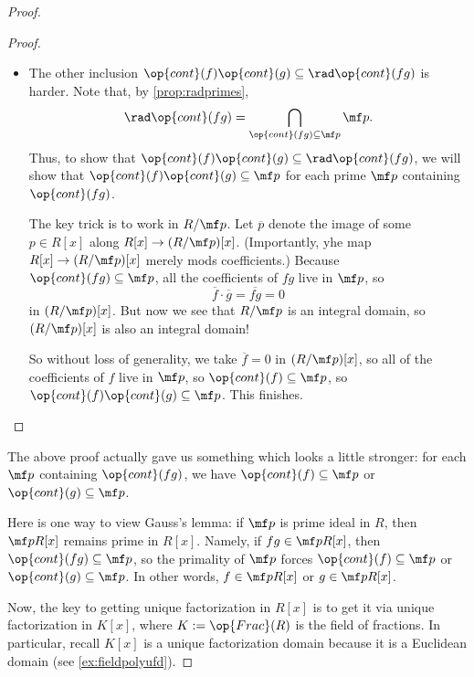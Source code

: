 \begin{proof}
\begin{proof}
\begin{itemize}
			\item The other inclusion $\op{cont}(f)\op{cont}(g)\subseteq\rad\op{cont}(fg)$ is harder. Note that, by \autoref{prop:radprimes},
			\[\rad\op{cont}(fg)=\bigcap_{\op{cont}(fg)\subseteq\mf p}\mf p.\]
			Thus, to show that $\op{cont}(f)\op{cont}(g)\subseteq\rad\op{cont}(fg)$, we will show that $\op{cont}(f)\op{cont}(g)\subseteq\mf p$ for each prime $\mf p$ containing $\op{cont}(fg)$.

			The key trick is to work in $R/\mf p$. Let $\overline p$ denote the image of some $p\in R[x]$ along $R[x]\to(R/\mf p)[x]$. (Importantly, yhe map $R[x]\to(R/\mf p)[x]$ merely mods coefficients.) Because $\op{cont}(fg)\subseteq\mf p$, all the coefficients of $fg$ live in $\mf p$, so
			\[\overline f\cdot\overline g=\overline{fg}=0\]
			in $(R/\mf p)[x]$. But now we see that $R/\mf p$ is an integral domain, so $(R/\mf p)[x]$ is also an integral domain!
			
			So without loss of generality, we take $\overline f=0$ in $(R/\mf p)[x]$, so all of the coefficients of $f$ live in $\mf p$, so $\op{cont}(f)\subseteq\mf p$, so $\op{cont}(f)\op{cont}(g)\subseteq\mf p$. This finishes.
			\qedhere
		\end{itemize}
	\end{proof}
	\begin{remark}[Nir] \label{rem:optimizegauss}
		The above proof actually gave us something which looks a little stronger: for each $\mf p$ containing $\op{cont}(fg)$, we have $\op{cont}(f)\subseteq\mf p$ or $\op{cont}(g)\subseteq\mf p$.
	\end{remark}
	\begin{remark}[Nir] \label{rem:primeslift}
		Here is one way to view Gauss's lemma: if $\mf p$ is prime ideal in $R$, then $\mf pR[x]$ remains prime in $R[x]$. Namely, if $fg\in\mf pR[x]$, then $\op{cont}(fg)\subseteq\mf p$, so the primality of $\mf p$ forces $\op{cont}(f)\subseteq\mf p$ or $\op{cont}(g)\subseteq\mf p$. In other words, $f\in\mf pR[x]$ or $g\in\mf pR[x]$.
	\end{remark}
	Now, the key to getting unique factorization in $R[x]$ is to get it via unique factorization in $K[x]$, where $K:=\op{Frac}(R)$ is the field of fractions. In particular, recall $K[x]$ is a unique factorization domain because it is a Euclidean domain (see \autoref{ex:fieldpolyufd}).


\end{proof}
